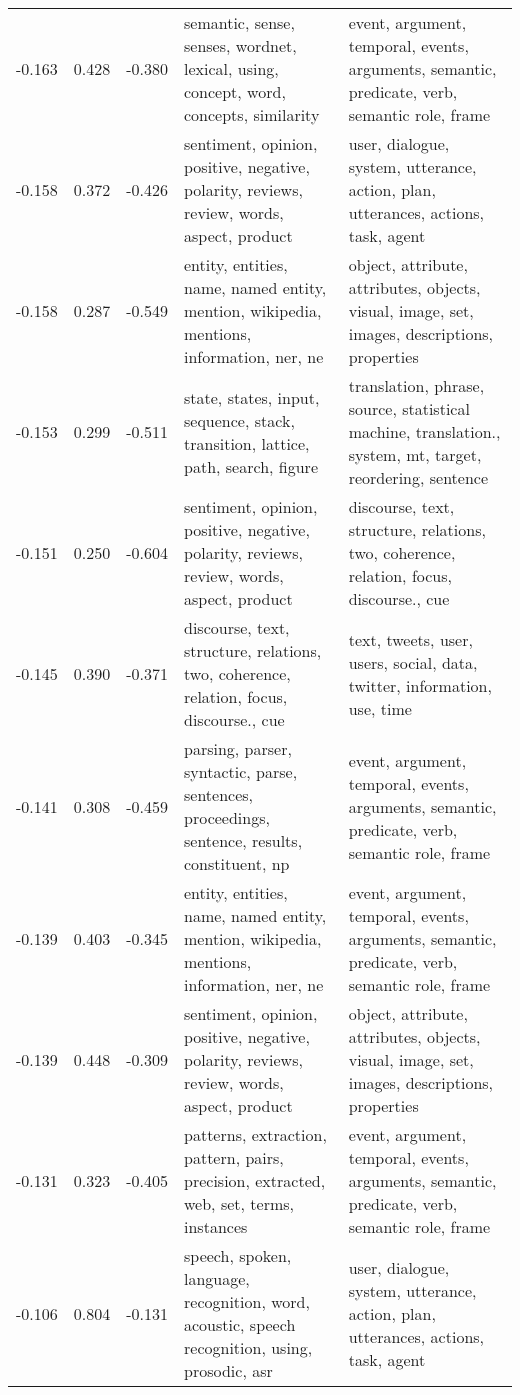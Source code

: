 \begin{tabular}{cccp{5cm}p{5cm}}
-0.163 & 0.428 & -0.380 & semantic, sense, senses, wordnet, lexical, using, concept, word, concepts, similarity & event, argument, temporal, events, arguments, semantic, predicate, verb, semantic role, frame \\
-0.158 & 0.372 & -0.426 & sentiment, opinion, positive, negative, polarity, reviews, review, words, aspect, product & user, dialogue, system, utterance, action, plan, utterances, actions, task, agent \\
-0.158 & 0.287 & -0.549 & entity, entities, name, named entity, mention, wikipedia, mentions, information, ner, ne & object, attribute, attributes, objects, visual, image, set, images, descriptions, properties \\
-0.153 & 0.299 & -0.511 & state, states, input, sequence, stack, transition, lattice, path, search, figure & translation, phrase, source, statistical machine, translation., system, mt, target, reordering, sentence \\
-0.151 & 0.250 & -0.604 & sentiment, opinion, positive, negative, polarity, reviews, review, words, aspect, product & discourse, text, structure, relations, two, coherence, relation, focus, discourse., cue \\
-0.145 & 0.390 & -0.371 & discourse, text, structure, relations, two, coherence, relation, focus, discourse., cue & text, tweets, user, users, social, data, twitter, information, use, time \\
-0.141 & 0.308 & -0.459 & parsing, parser, syntactic, parse, sentences, proceedings, sentence, results, constituent, np & event, argument, temporal, events, arguments, semantic, predicate, verb, semantic role, frame \\
-0.139 & 0.403 & -0.345 & entity, entities, name, named entity, mention, wikipedia, mentions, information, ner, ne & event, argument, temporal, events, arguments, semantic, predicate, verb, semantic role, frame \\
-0.139 & 0.448 & -0.309 & sentiment, opinion, positive, negative, polarity, reviews, review, words, aspect, product & object, attribute, attributes, objects, visual, image, set, images, descriptions, properties \\
-0.131 & 0.323 & -0.405 & patterns, extraction, pattern, pairs, precision, extracted, web, set, terms, instances & event, argument, temporal, events, arguments, semantic, predicate, verb, semantic role, frame \\
-0.106 & 0.804 & -0.131 & speech, spoken, language, recognition, word, acoustic, speech recognition, using, prosodic, asr & user, dialogue, system, utterance, action, plan, utterances, actions, task, agent \\

\end{tabular}

